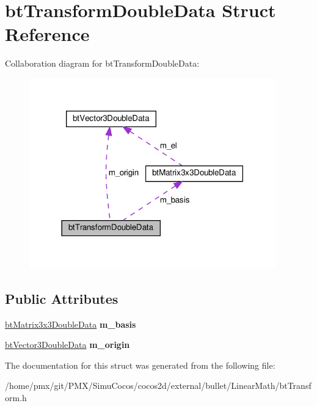 \hypertarget{structbtTransformDoubleData}{}\section{bt\+Transform\+Double\+Data Struct Reference}
\label{structbtTransformDoubleData}


Collaboration diagram for bt\+Transform\+Double\+Data\+:
\nopagebreak
\begin{figure}[H]
\begin{center}
\leavevmode
\includegraphics[width=302pt]{structbtTransformDoubleData__coll__graph}
\end{center}
\end{figure}
\subsection*{Public Attributes}
\begin{DoxyCompactItemize}
\item 
\mbox{\label{structbtTransformDoubleData_a7f05735527469df9cb683c8651931e31}} 
\hyperlink{structbtMatrix3x3DoubleData}{bt\+Matrix3x3\+Double\+Data} {\bfseries m\+\_\+basis}
\item 
\mbox{\label{structbtTransformDoubleData_a217df5931853c98dc3a53fd6f8715ac4}} 
\hyperlink{structbtVector3DoubleData}{bt\+Vector3\+Double\+Data} {\bfseries m\+\_\+origin}
\end{DoxyCompactItemize}


The documentation for this struct was generated from the following file\+:\begin{DoxyCompactItemize}
\item 
/home/pmx/git/\+P\+M\+X/\+Simu\+Cocos/cocos2d/external/bullet/\+Linear\+Math/bt\+Transform.\+h\end{DoxyCompactItemize}
